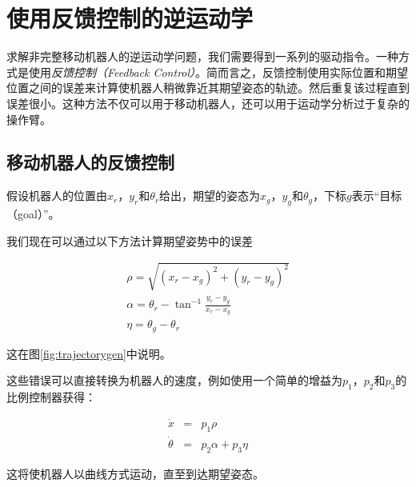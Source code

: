 \section{使用反馈控制的逆运动学} 
\label{sec:advinvkinematics}

求解非完整移动机器人的逆运动学问题，我们需要得到一系列的驱动指令。一种方式是使用\emph{反馈控制（Feedback Control）}。简而言之，反馈控制使用实际位置和期望位置之间的误差来计算使机器人稍微靠近其期望姿态的轨迹。然后重复该过程直到误差很小。这种方法不仅可以用于移动机器人，还可以用于运动学分析过于复杂的操作臂。

\subsection {移动机器人的反馈控制} 
\label{sec:fbmobile}

假设机器人的位置由$x_r$，$y_r $和$ \theta_r $给出，期望的姿态为$ x_g$，$y_g $和$ \theta_g $，下标$ g $表示“目标（goal）”。

我们现在可以通过以下方法计算期望姿势中的误差

\begin{eqnarray}
\rho=\sqrt{(x_r-x_g)^2+(y_r-y_g)^2}\\
\nonumber
\alpha=\theta_r-\tan^{-1}{\frac{y_r-y_g}{x_r-x_g}}\\
\nonumber
\eta=\theta_g-\theta_r
\end{eqnarray}

这在图\ref{fig:trajectorygen}中说明。


这些错误可以直接转换为机器人的速度，例如使用一个简单的增益为$p_1$，$p_2$和$p_3$的比例控制器获得：

\begin{eqnarray}
\dot{x} &=& p_1 \rho\\
\dot{\theta} &=& p_2 \alpha + p_3 \eta
\end{eqnarray}

这将使机器人以曲线方式运动，直至到达期望姿态。

